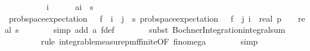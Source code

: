 \begin{isabellebody}
\ \ \isamarkupfalse%
\ {\isacharminus}{\kern0pt}\isanewline
\ \ \ \ \isamarkupfalse%
\ i\isanewline
\ \ \ \ \isamarkupfalse%
\ a{\isacharcolon}{\kern0pt}{\isachardoublequoteopen}i\ {\isacharless}{\kern0pt}\ s\isanewline
\ \ \ \ \isamarkupfalse%
\ {\isachardoublequoteopen}prob{\isacharunderscore}{\kern0pt}space{\isachardot}{\kern0pt}expectation\ {\isasymOmega}\ {\isacharparenleft}{\kern0pt}{\isasymlambda}{\isasymomega}{\isachardot}{\kern0pt}\ f{}\ {\isasymomega}\ i{\isacharparenright}{\kern0pt}\ {\isacharequal}{\kern0pt}\ {\isacharparenleft}{\kern0pt}{\isasymSum}j\ {\isacharequal}{\kern0pt}\ {}{\isachardot}{\kern0pt}{\isachardot}{\kern0pt}{\isacharless}{\kern0pt}s\ prob{\isacharunderscore}{\kern0pt}space{\isachardot}{\kern0pt}expectation\ {\isasymOmega}\ {\isacharparenleft}{\kern0pt}{\isasymlambda}{\isasymomega}{\isachardot}{\kern0pt}\ f{}\ {\isasymomega}\ j\ i{\isacharparenright}{\kern0pt}{\isacharparenright}{\kern0pt}\ {\isacharslash}{\kern0pt}\ {\isacharparenleft}{\kern0pt}{\isacharparenleft}{\kern0pt}{\isacharparenleft}{\kern0pt}real\ p{\isacharparenright}{\kern0pt}\ {\isacharminus}{\kern0pt}\ {}{\isacharparenright}{\kern0pt}\ {\isacharasterisk}{\kern0pt}\ real\ s\isanewline
\ \ \ \ \ \ \isamarkupfalse%
\ {\isacharparenleft}{\kern0pt}simp\ add{\isacharcolon}{\kern0pt}\ a\ f{}{\isacharunderscore}{\kern0pt}def{\isacharparenright}{\kern0pt}\isanewline
\ \ \ \ \ \ \isamarkupfalse%
\ {\isacharparenleft}{\kern0pt}subst\ Bochner{\isacharunderscore}{\kern0pt}Integration{\isachardot}{\kern0pt}integral{\isacharunderscore}{\kern0pt}sum{\isacharparenright}{\kern0pt}\isanewline
\ \ \ \ \ \ \ \isamarkupfalse%
\ {\isacharparenleft}{\kern0pt}rule\ integrable{\isacharunderscore}{\kern0pt}measure{\isacharunderscore}{\kern0pt}pmf{\isacharunderscore}{\kern0pt}finite{\isacharbrackleft}{\kern0pt}OF\ fin{\isacharunderscore}{\kern0pt}omega{\isacharunderscore}{\kern0pt}{}{\isacharbrackright}{\kern0pt}{\isacharparenright}{\kern0pt}\isanewline
\ \ \ \ \ \ \isamarkupfalse%
\ simp\isanewline
\ \ \ \ \isamarkupfalse%
\ \isamarkupfalse%

\end{isabellebody}
